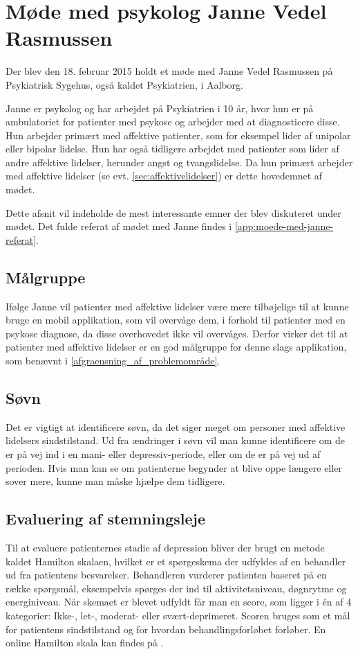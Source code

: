 \section{Møde med psykolog Janne Vedel Rasmussen}\label{sec:moede-med-psykolog}
Der blev den 18. februar 2015 holdt et møde med Janne Vedel Rasmussen på Psykiatrisk Sygehus, også kaldet Psykiatrien, i Aalborg.

Janne er psykolog og har arbejdet på Psykiatrien i 10 år, hvor hun er på ambulatoriet for patienter med psykose og arbejder med at diagnosticere disse. 
Hun arbejder primært med affektive patienter, som for eksempel lider af unipolar eller bipolar lidelse.
Hun har også tidligere arbejdet med patienter som lider af andre affektive lidelser, herunder angst og tvangslidelse.
Da hun primært arbejder med affektive lidelser (se evt. \cref{sec:affektivelidelser}) er dette hovedemnet af mødet.

Dette afsnit vil indeholde de mest interessante emner der blev diskuteret under mødet.
Det fulde referat af mødet med Janne findes i \cref{app:moede-med-janne-referat}.

\subsection{Målgruppe}
Ifølge Janne vil patienter med affektive lidelser være mere tilbøjelige til at kunne bruge en mobil applikation, som vil overvåge dem, i forhold til patienter med en psykose diagnose, da disse overhovedet ikke vil overvåges.
Derfor virker det til at patienter med affektive lidelser er en god målgruppe for denne slags applikation, som benævnt i \cref{afgraensning_af_problemområde}.

\subsection{Søvn}
Det er vigtigt at identificere søvn, da det siger meget om personer med affektive lidelsers sindstilstand.
Ud fra ændringer i søvn vil man kunne identificere om de er på vej ind i en mani- eller depressiv-periode, eller om de er på vej ud af perioden. 
Hvis man kan se om patienterne begynder at blive oppe længere eller sover mere, kunne man måske hjælpe dem tidligere.

\subsection{Evaluering af stemningsleje}
Til at evaluere patienternes stadie af depression bliver der brugt en metode kaldet Hamilton skalaen, hvilket er et spørgeskema der udfyldes af en behandler ud fra patientens besvarelser. 
Behandleren vurderer patienten baseret på en række spørgsmål, eksempelvis spørges der ind til aktivitetsniveau, døgnrytme og energiniveau.
Når skemaet er blevet udfyldt får man en score, som ligger i én af 4 kategorier: Ikke-, let-, moderat- eller svært-deprimeret. 
Scoren bruges som et mål for patientens sindstilstand og for hvordan behandlingsforløbet forløber.
En online Hamilton skala kan findes på \citet{hamilton}.

